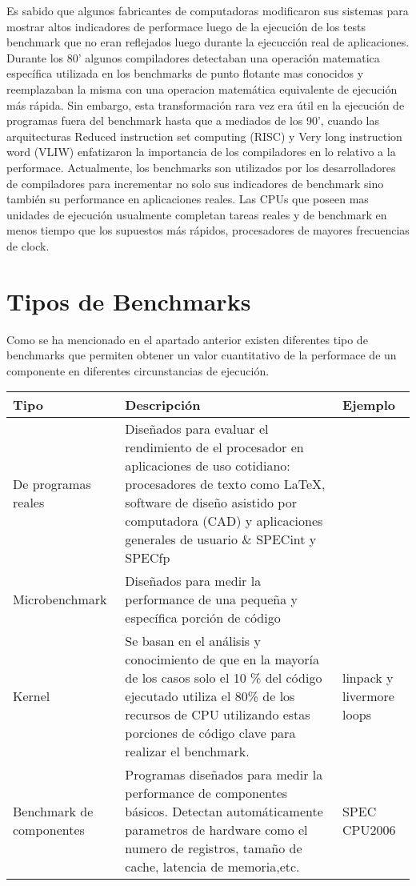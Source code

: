 	Es sabido que algunos fabricantes de computadoras modificaron sus sistemas para mostrar altos indicadores de performace luego de la ejecución de los
	tests benchmark que no eran reflejados luego durante la ejecucción real de aplicaciones. Durante los 80' algunos compiladores detectaban una
	operación matematica específica utilizada en los benchmarks de punto flotante mas conocidos y reemplazaban la misma con una operacion matemática
	equivalente de ejecución más rápida. Sin embargo, esta transformación rara vez era útil en la ejecución de programas fuera del benchmark hasta que a
	mediados de los 90', cuando las arquitecturas Reduced instruction set computing (RISC) y Very long instruction word (VLIW) enfatizaron la importancia
	de los compiladores en lo relativo a la performace. Actualmente, los benchmarks son utilizados por los desarrolladores de compiladores para
	incrementar no solo sus indicadores de benchmark sino también su performance en aplicaciones reales. Las CPUs que poseen mas unidades de ejecución
	usualmente completan tareas reales y de benchmark en menos tiempo que los supuestos más rápidos, procesadores de mayores frecuencias de clock.
	
	\section{Tipos de Benchmarks}
	Como se ha mencionado en el apartado anterior existen diferentes tipo de benchmarks que permiten obtener un valor cuantitativo de la performace de un
	componente en diferentes circunstancias de ejecución.
	
		\begin{tabular}{ p{2.5cm} p{8cm} p{3cm} }
		\hline 
		\rowcolor[gray]{0.8} Tipo & Descripción & Ejemplo \\
		\hline
		De programas reales  &  Diseñados para evaluar el rendimiento de el procesador en aplicaciones de uso cotidiano: procesadores de texto
		como \LaTeX, software de diseño asistido por computadora (CAD) y aplicaciones generales de usuario \& SPECint y SPECfp\\
		\hline
		Microbenchmark  &  Diseñados para medir la performance de una pequeña y específica porción de código \\
		\hline
		Kernel			&  Se basan en el análisis y conocimiento de que en la mayoría de los casos solo el 10 \% del código ejecutado utiliza el 80\% de los
		recursos de CPU utilizando estas porciones de código clave para realizar el benchmark.\cite{EtiquetaBM01} & linpack y livermore loops\\
		\hline
		Benchmark de componentes & Programas diseñados para medir la performance de componentes básicos. Detectan automáticamente parametros de hardware
		como el numero de registros, tamaño de cache, latencia de memoria,etc. &  SPEC CPU2006\\
		\hline
		
		\end{tabular}
	
